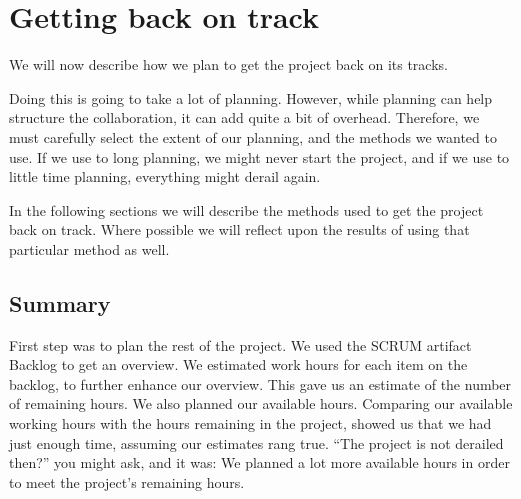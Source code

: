 \section{Getting back on track}
We will now describe how we plan to get the project back on its tracks.

Doing this is going to take a lot of planning. However, while planning can help structure the collaboration, it can add quite a bit of overhead. Therefore, we must carefully select the extent of our planning, and the methods we wanted to use. If we use to long planning, we might never start the project, and if we use to little time planning, everything might derail again.

In the following sections we will describe the methods used to get the project back on track. Where possible we will reflect upon the results of using that particular method as well.






\subsection{Summary}
First step was to plan the rest of the project. We used the SCRUM artifact Backlog to get an overview. We estimated work hours for each item on the backlog, to further enhance our overview. This gave us an estimate of the number of remaining hours. We also planned our available hours. Comparing our available working hours with the hours remaining in the project, showed us that we had just enough time, assuming our estimates rang true. ``The project is not derailed then?'' you might ask, and it was: We planned a lot more available hours in order to meet the project's remaining hours.
\newpage